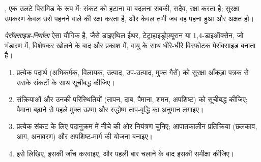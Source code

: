 \begin{omfigure}

{\small {}, एक उलटे पिरामिड के रूप में: संकट को हटाना या बदलना
सबकी, सदैव, रक्षा करता है; सुरक्षा उपकरण केवल उसे पहनने वाले की रक्षा करता है,
और केवल तभी जब वह पहना हुआ और अक्षत हो।}
\end{omfigure}

\begin{definition}[पेरॉक्साइड-निर्माता]\label{def:b3:lab-techniques-3:peroxide}
\emph{पेरॉक्साइड-निर्माता} ऐसा यौगिक है, जैसे डाइएथिल
ईथर, टेट्राहाइड्रोफ़्यूरान या 1,4-डाइऑक्सेन, जो भंडारण में, विशेषकर खोलने के बाद और प्रकाश में,
वायु के साथ धीरे-धीरे विस्फोटक पेरॉक्साइड बनाता है।
\end{definition}

\begin{method}[किसी नई प्रक्रिया के जोखिमों का मूल्यांकन]\label{met:b3:lab-techniques-3:risk-assessment}
\begin{enumerate}
  \item प्रत्येक पदार्थ (अभिकर्मक, विलायक, उत्पाद, उप-उत्पाद, मुक्त
        गैसें) को सुरक्षा आँकड़ा पत्रक से उसके संकटों के साथ सूचीबद्ध कीजिए।
  \item संक्रियाओं और उनकी परिस्थितियों (तापन, दाब, पैमाना,
        शमन, अपशिष्ट) को सूचीबद्ध कीजिए; पैमाना बढ़ाने से पहले मुक्त ऊष्मा और रुद्धोष्म ताप-वृद्धि
        का अनुमान लगाइए।
  \item प्रत्येक संकट के लिए पदानुक्रम में नीचे की ओर नियंत्रण चुनिए; आपातकालीन
        प्रतिक्रिया (छलकाव, आग, अनावरण) और अपशिष्ट-मार्ग की योजना बनाइए।
  \item इसे लिखिए, इसकी जाँच करवाइए, और पहली बार चलाने के बाद इसकी समीक्षा कीजिए।
\end{enumerate}
\end{method}

